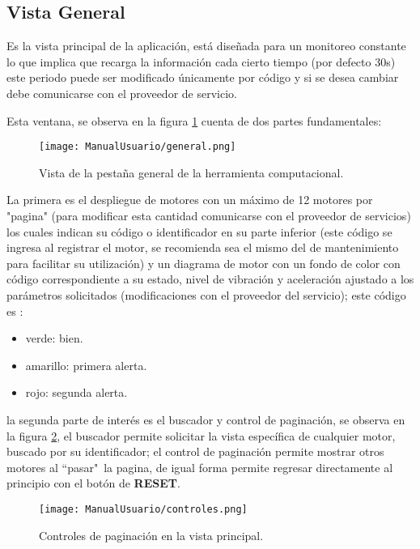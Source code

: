 \subsection{Vista General}
Es la vista principal de la aplicación, está diseñada para un monitoreo constante
lo que implica que recarga la información cada cierto tiempo (por defecto 30s)
este periodo puede ser modificado únicamente por código y si se desea cambiar debe
comunicarse con el proveedor de servicio.

Esta ventana, se observa en la figura \ref{img:vistaGeneralManual}
cuenta de dos partes fundamentales:

    \begin{figure}[H]
		\centering
        \caption{Vista de la pestaña general de la herramienta computacional. }
        \texttt{[image: ManualUsuario/general.png]}
        \label{img:vistaGeneralManual}
	\end{figure}

La primera es el despliegue de motores
con un máximo de 12 motores por "pagina" (para modificar esta cantidad comunicarse
con el proveedor de servicios) los cuales indican su código o identificador en
su parte inferior (este código se ingresa al registrar el motor, se recomienda sea
el mismo del de mantenimiento para facilitar su utilización) y un diagrama de
motor con un fondo de color con código correspondiente a su estado, nivel de
vibración y aceleración ajustado a los parámetros solicitados (modificaciones con
el proveedor del servicio); este código es :

\begin{itemize}
    \item  verde: bien.
    \item amarillo: primera alerta.
    \item rojo: segunda alerta.
\end{itemize}

la segunda parte de interés es el buscador y control de paginación, se observa en
la figura \ref{img:buscadoreGeneral}, el buscador permite solicitar la vista
específica de cualquier motor, buscado por su identificador;
el control de paginación permite mostrar otros motores al ``pasar"\ la pagina,
de igual forma permite regresar directamente al principio con el botón de
\textbf{RESET}.

    \begin{figure}[H]
		\centering
        \caption{Controles de paginación en la vista principal. }
        \texttt{[image: ManualUsuario/controles.png]}
        \label{img:buscadoreGeneral}
	\end{figure}


